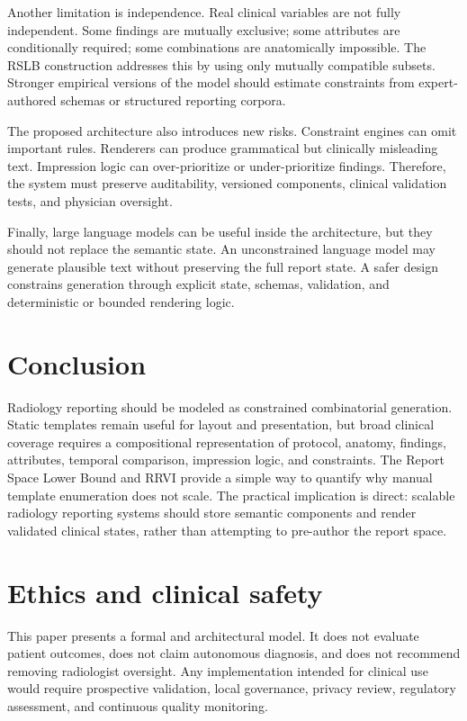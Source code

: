 \documentclass[11pt]{article}
\begin{document}
Another limitation is independence. Real clinical variables are not fully independent. Some findings are mutually exclusive; some attributes are conditionally required; some combinations are anatomically impossible. The RSLB construction addresses this by using only mutually compatible subsets. Stronger empirical versions of the model should estimate constraints from expert-authored schemas or structured reporting corpora.

The proposed architecture also introduces new risks. Constraint engines can omit important rules. Renderers can produce grammatical but clinically misleading text. Impression logic can over-prioritize or under-prioritize findings. Therefore, the system must preserve auditability, versioned components, clinical validation tests, and physician oversight.

Finally, large language models can be useful inside the architecture, but they should not replace the semantic state. An unconstrained language model may generate plausible text without preserving the full report state. A safer design constrains generation through explicit state, schemas, validation, and deterministic or bounded rendering logic.

\section{Conclusion}

Radiology reporting should be modeled as constrained combinatorial generation. Static templates remain useful for layout and presentation, but broad clinical coverage requires a compositional representation of protocol, anatomy, findings, attributes, temporal comparison, impression logic, and constraints. The Report Space Lower Bound and RRVI provide a simple way to quantify why manual template enumeration does not scale. The practical implication is direct: scalable radiology reporting systems should store semantic components and render validated clinical states, rather than attempting to pre-author the report space.

\section*{Ethics and clinical safety}
This paper presents a formal and architectural model. It does not evaluate patient outcomes, does not claim autonomous diagnosis, and does not recommend removing radiologist oversight. Any implementation intended for clinical use would require prospective validation, local governance, privacy review, regulatory assessment, and continuous quality monitoring.
\end{document}
